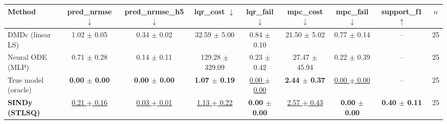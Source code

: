 \begin{tabular}{lcccccccc}
\toprule
Method & pred\_nrmse $\downarrow$ & pred\_nrmse\_h5 $\downarrow$ & lqr\_cost $\downarrow$ & lqr\_fail $\downarrow$ & mpc\_cost $\downarrow$ & mpc\_fail $\downarrow$ & support\_f1 $\uparrow$ & $n$ \\
\midrule
DMDc (linear LS) & 1.02 $\pm$ 0.05 & 0.34 $\pm$ 0.02 & 32.59 $\pm$ 5.00 & 0.84 $\pm$ 0.10 & 21.50 $\pm$ 5.02 & 0.77 $\pm$ 0.14 & -- & 25 \\
Neural ODE (MLP) & 0.71 $\pm$ 0.28 & 0.14 $\pm$ 0.11 & 129.28 $\pm$ 329.09 & 0.23 $\pm$ 0.42 & 27.47 $\pm$ 45.94 & 0.22 $\pm$ 0.39 & -- & 25 \\
True model (oracle) & \textbf{0.00 $\pm$ 0.00} & \textbf{0.00 $\pm$ 0.00} & \textbf{1.07 $\pm$ 0.19} & \underline{0.00 $\pm$ 0.00} & \textbf{2.44 $\pm$ 0.37} & \underline{0.00 $\pm$ 0.00} & -- & 25 \\
\textbf{SINDy (STLSQ)} & \underline{0.21 $\pm$ 0.16} & \underline{0.03 $\pm$ 0.01} & \underline{1.13 $\pm$ 0.22} & \textbf{0.00 $\pm$ 0.00} & \underline{2.57 $\pm$ 0.43} & \textbf{0.00 $\pm$ 0.00} & \textbf{0.40 $\pm$ 0.11} & 25 \\
\bottomrule
\end{tabular}
